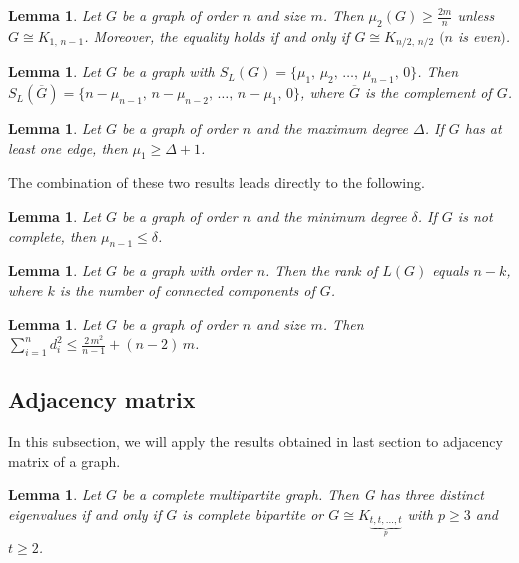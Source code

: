 \documentclass[12pt]{article}
\newtheorem{lemma}[theorem]{Lemma}
\begin{document}
   \begin{lemma} \label{newle1} {\rm \cite{DM}} Let $G$ be a graph of order $n$ and size $m$.
 Then $\mu_2(G)\geq \frac{2m}{n}$ unless $G\cong K_{1,\,n-1}$. Moreover, the equality holds if and only
 if $G\cong K_{n/2,\,n/2}$ $(n$ is even$)$.
 \end{lemma}


   \begin{lemma} \label{newle2} {\rm \cite{MERRIS}} Let $G$ be a graph with $S_L(G)=\{\mu_1,\,\mu_2,\,\ldots,\,\mu_{n-1},\,0\}$.
 Then $S_L(\overline{G})=\{n-\mu_{n-1},\,n-\mu_{n-2},\,\ldots,\,n-\mu_{1},\,0\}$,
 where $\overline{G}$ is the complement of $G$.
 \end{lemma}
     \begin{lemma} \label{newle3} {\rm \cite{MERRIS}} Let $G$ be a graph of order $n$ and the maximum degree
   $\Delta$. If $G$ has at least one edge, then  $\mu_1\geq \Delta+1$.
 \end{lemma}
 The combination of these two results leads directly to the following.

    \begin{lemma} \label{newsundas} Let $G$ be a graph of order $n$ and the minimum degree
   $\delta$. If $G$ is not complete, then  $\mu_{n-1}\leq \delta$.
 \end{lemma}




  \begin{lemma} \label{cor4}  {\rm \cite{B}}
    Let $G$ be a graph with order $n$. Then the rank of $L(G)$ equals $n-k$, where $k$ is the number of connected components of $G$.
  \end{lemma}


  \begin{lemma} \label{2le1} {\rm \cite{CAE}} Let $G$ be a graph of order $n$ and size $m$.
 Then $\sum\limits_{i=1}^n d^2_i\leq \frac{2\,m^2}{n-1}+(n-2)\,m$.
 \end{lemma}

\subsection{Adjacency matrix}
In this subsection, we will apply the results obtained in last
section to adjacency matrix of a graph.

\begin{lemma} \label{le4}
  Let $G$ be a complete multipartite graph. Then G has three distinct eigenvalues if and only if  $G$ is complete bipartite or $G\cong K_{\underbrace{t,t,\dots,t}_p}$ with $p\geq 3$ and $t\geq 2$.
\end{lemma}
\end{document}
